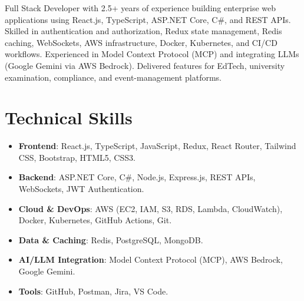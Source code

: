 \documentclass[11pt,a4paper,sans]{moderncv}
\begin{document}
\makecvtitle


\vspace{6pt}
\small{Full Stack Developer with 2.5+ years of experience building enterprise web applications using React.js, TypeScript, ASP.NET Core, C\#, and REST APIs. Skilled in authentication and authorization, Redux state management, Redis caching, WebSockets, AWS infrastructure, Docker, Kubernetes, and CI/CD workflows. Experienced in Model Context Protocol (MCP) and integrating LLMs (Google Gemini via AWS Bedrock). Delivered features for EdTech, university examination, compliance, and event-management platforms.}


\section{Technical Skills}
\vspace{1pt}
\begin{itemize}

\item \textbf{Frontend}: React.js, TypeScript, JavaScript, Redux, React Router, Tailwind CSS, Bootstrap, HTML5, CSS3.

\item \textbf{Backend}: ASP.NET Core, C\#, Node.js, Express.js, REST APIs, WebSockets, JWT Authentication.

\item \textbf{Cloud \& DevOps}: AWS (EC2, IAM, S3, RDS, Lambda, CloudWatch), Docker, Kubernetes, GitHub Actions, Git.

\item \textbf{Data \& Caching}: Redis, PostgreSQL, MongoDB.

\item \textbf{AI/LLM Integration}: Model Context Protocol (MCP), AWS Bedrock, Google Gemini.

\item \textbf{Tools}: GitHub, Postman, Jira, VS Code.

\end{itemize}

\end{document}
